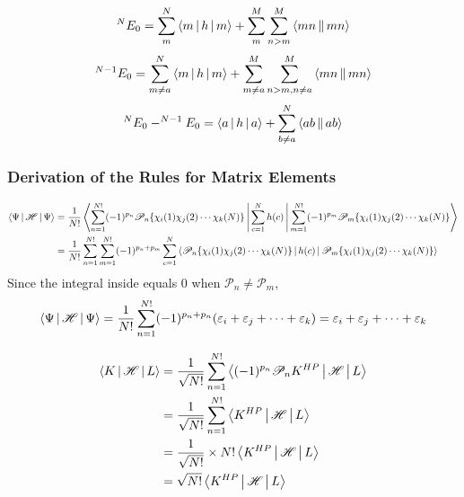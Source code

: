 \documentclass[a4paper]{article}
\begin{document}
\begin{equation}\label{key}
^N E_0 = \sum_m^N \Braket{m|h|m} + \sum_m^M\sum_{n>m}^M \Braket{mn||mn}
\end{equation}
\begin{equation}\label{key}
^{N-1}E_0 = \sum_{m\neq a}^N \Braket{m|h|m} + \sum_{m\neq a}^M\sum_{n>m, n\neq a}^M \Braket{mn||mn}
\end{equation}
\begin{equation}\label{key}
^N E_0 - ^{N-1}E_0 = \Braket{a|h|a} + \sum_{b\neq a}^N \Braket{ab||ab}
\end{equation}

\subsubsection{Derivation of the Rules for Matrix Elements}
\begin{equation}\label{key}
\begin{aligned}
\Braket{\Psi | \mathscr{H} | \Psi} &= \dfrac{1}{N!} \Braket{\sum_{n=1}^{N!} (-1)^{p_n}\mathscr{P}_n\{\chi_i(1)\chi_j(2)\cdots\chi_k(N)\} | \sum_{c=1}^N h(c) | \sum_{m=1}^{N!} (-1)^{p_m}\mathscr{P}_m\{\chi_i(1)\chi_j(2)\cdots\chi_k(N)\}}\\
&= \dfrac{1}{N!} \sum_{n=1}^{N!} \sum_{m=1}^{N!} (-1)^{p_n + p_m} \sum_{c=1}^N \Braket{ \mathscr{P}_n \{\chi_i(1)\chi_j(2)\cdots\chi_k(N)\} |  h(c) | \mathscr{P}_m \{ \chi_i(1)\chi_j(2)\cdots\chi_k(N)\}}\\
\end{aligned}
\end{equation}
Since the integral inside equals $ 0 $ when $ \mathscr{P}_n \neq \mathscr{P}_m $,
\begin{equation}\label{key}
\Braket{\Psi | \mathscr{H} | \Psi} = \dfrac{1}{N!} \sum_{n=1}^{N!} (-1)^{p_n + p_n} (\varepsilon_i+\varepsilon_j+\cdots+\varepsilon_k) = \varepsilon_i+\varepsilon_j+\cdots+\varepsilon_k
\end{equation}

%
\begin{align}\label{key}
\Braket{K | \mathscr{H} | L} &= \dfrac{1}{\sqrt{N!}} \sum_{n=1}^{N!}  \Braket{(-1)^{p_n} \mathscr{P}_n K^{HP} | \mathscr{H} | L} \notag\\
&= \dfrac{1}{\sqrt{N!}} \sum_{n=1}^{N!}  \Braket{  K^{HP} | \mathscr{H} | L} \notag\\
&= \dfrac{1}{\sqrt{N!}} \times N! \Braket{  K^{HP} | \mathscr{H} | L} \notag\\
&= \sqrt{N!} \Braket{  K^{HP} | \mathscr{H} | L}
\end{align}
\end{document}

